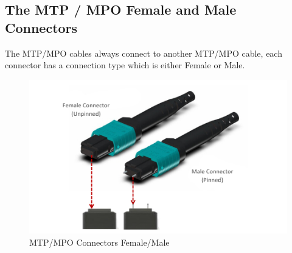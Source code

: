   \subsection{The MTP / MPO Female and Male Connectors}
  The MTP/MPO cables always connect to another MTP/MPO cable, each connector has a connection type which is either Female or Male.
  \begin{figure}
    \includegraphics[width=\textwidth]{images/5.jpeg}
    \caption{MTP/MPO Connectors Female/Male}
  \end{figure}

\newpage

